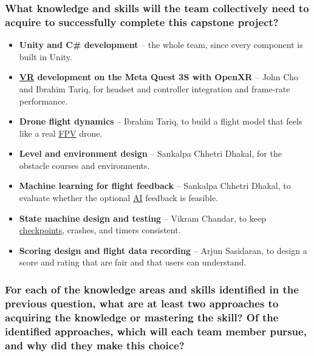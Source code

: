 \documentclass[12pt]{article}
\begin{document}
\subsubsection*{What knowledge and skills will the team collectively need to
acquire to successfully complete this capstone project?}

\begin{itemize}
\item \textbf{Unity and C\# development} -- the whole team, since every
component is built in Unity.
\item \textbf{\hyperlink{glos:VR}{VR} development on the Meta Quest 3S with OpenXR} -- John Cho and
Ibrahim Tariq, for headset and controller integration and frame-rate
performance.
\item \textbf{Drone flight dynamics} -- Ibrahim Tariq, to build a flight model
that feels like a real \hyperlink{glos:FPV}{FPV} drone.
\item \textbf{Level and environment design} -- Sankalpa Chhetri Dhakal, for
the obstacle courses and environments.
\item \textbf{Machine learning for flight feedback} -- Sankalpa Chhetri
Dhakal, to evaluate whether the optional \hyperlink{glos:AI}{AI} feedback is feasible.
\item \textbf{State machine design and testing} -- Vikram Chandar, to keep
\hyperlink{glos:Checkpoint}{checkpoints}, crashes, and timers consistent.
\item \textbf{Scoring design and flight data recording} -- Arjun Sasidaran,
to design a score and rating that are fair and that users can understand.
\end{itemize}

\subsubsection*{For each of the knowledge areas and skills identified in the
previous question, what are at least two approaches to acquiring the
knowledge or mastering the skill? Of the identified approaches, which will
each team member pursue, and why did they make this choice?}
\end{document}
